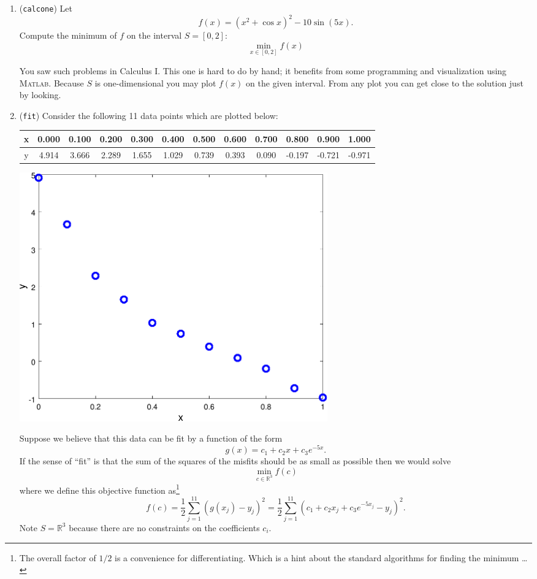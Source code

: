 \documentclass[11pt]{amsart}
\newcommand{\RR}{\mathbb{R}}
\newcommand{\Matlab}{\textsc{Matlab}\xspace}
\begin{document}
\bigskip
\renewcommand{\labelenumi}{\Roman{enumi}. \quad}
\begin{enumerate}
\item (\texttt{calcone})  \quad Let
    $$f(x) = \left(x^2 + \cos x\right)^2 - 10 \sin(5 x).$$
Compute the minimum of $f$ on the interval $S=[0,2]$:
    $$\min_{x\in [0,2]} f(x)$$

You saw such problems in Calculus I.  This one is hard to do by hand; it benefits from some programming and visualization using \Matlab.  Because $S$ is one-dimensional you may plot $f(x)$ on the given interval.  From any plot you can get close to the solution just by looking.


\medskip
\item (\texttt{fit})  \quad Consider the following 11 data points which are plotted below:

\bigskip
\begin{tabular}{c|ccccccccccc}
x & 0.000 & 0.100 & 0.200 & 0.300 & 0.400 & 0.500 & 0.600 & 0.700 &  0.800 &  0.900 &  1.000 \\
\hline
y & 4.914 & 3.666 & 2.289 & 1.655 & 1.029 & 0.739 & 0.393 & 0.090 & -0.197 & -0.721 & -0.971
\end{tabular}

\bigskip
\begin{center}
\includegraphics[width=0.6\textwidth]{fitdata}
\end{center}

\medskip
Suppose we believe that this data can be fit by a function of the form
    $$g(x) = c_1 + c_2 x + c_3 e^{-5 x}.$$
If the sense of ``fit'' is that the sum of the squares of the misfits should be as small as possible then we would solve
	$$\min_{c \in \RR^3} f(c)$$
where we define this objective function as\footnote{The overall factor of $1/2$ is a convenience for differentiating.  Which is a hint about the standard algorithms for finding the minimum \dots} 
	$$f(c) = \frac{1}{2} \sum_{j=1}^{11} \left(g(x_j) - y_j\right)^2 = \frac{1}{2} \sum_{j=1}^{11} \left(c_1 + c_2 x_j + c_3 e^{-5 x_j} - y_j\right)^2.$$
Note $S=\RR^3$ because there are no constraints on the coefficients $c_i$.


\end{enumerate}
\end{document}

